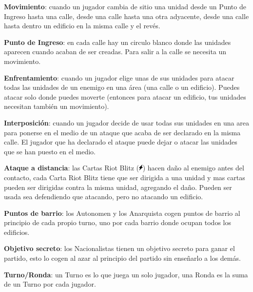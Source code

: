 \documentclass[a4paper,13pt]{scrartcl}
\begin{document}
\textbf{Movimiento}: cuando un jugador cambia de sitio una unidad desde un Punto de Ingreso hasta una calle, desde una
calle hasta una otra adyacente, desde una calle hasta dentro un edificio en la misma calle y el rev\'es. 

\textbf{Punto de Ingreso}: en cada calle hay un circulo blanco donde las unidades aparecen cuando acaban de ser creadas.
Para salir a la calle se necesita un movimiento.

\textbf{Enfrentamiento}: cuando un jugador elige unas de sus unidades para atacar todas las unidades de un enemigo en
una \'area (una calle o un edificio). Puedes atacar solo donde puedes moverte (entonces para atacar un edificio, tus
unidades necesitan tambi\'en un movimiento).

\textbf{Interposici\'on}: cuando un jugador decide de usar todas sus unidades en una area para ponerse en el medio de un
ataque que acaba de ser declarado en la misma calle. El jugador que ha declarado el ataque puede dejar o atacar las
unidades que se han puesto en el medio.

\textbf{Ataque a distancia}: las Cartas Riot Blitz (\includegraphics[height=9pt]{blitz.png}) hacen da\~no al enemigo antes del contacto, cada Carta Riot Blitz
tiene que ser dirigida a una unidad y mas cartas pueden ser dirigidas contra la misma unidad, agregando el da\~no.
Pueden ser usada sea defendiendo que atacando, pero no atacando un edificio.

\textbf{Puntos de barrio}: los Autonomen y los Anarquista cogen puntos de barrio al principio de cada propio turno, uno
por cada barrio donde ocupan todos los edificios.

\textbf{Objetivo secreto}: los Nacionalistas tienen un objetivo secreto para ganar el partido, esto lo cogen al azar al
principio del partido sin ense\~narlo a los dem\'as.

\textbf{Turno/Ronda}: un Turno es lo que juega un solo jugador, una Ronda es la suma de un Turno por cada jugador.
\end{document}
